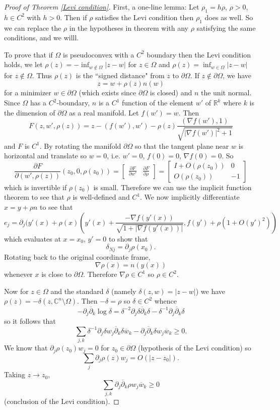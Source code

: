 \documentclass[12pt]{report}
\newcommand{\RR}{\mathbb{R}}
\newcommand{\CC}{\mathbb{C}}
\newcommand{\dbar}{\overline\partial}
\theoremstyle{definition}
\begin{document}
\begin{proof}[Proof of Theorem \ref{Levi condition}]
    First, a one-line lemma: Let $\rho_1 = h\rho$, $\rho > 0$, $h \in C^2$ with $h > 0$. Then if $\rho$ satisfies the Levi condition then $\rho_1$ does as well. So we can replace the $\rho$ in the hypotheses in theorem with any $\rho$ satisfying the same conditions, and we willl.

    To prove that if $\Omega$ is pseudoconvex with a $C^2$ boundary then the Levi condition holds, we let $\rho(z) = -\inf_{w \notin \Omega} |z - w|$ for $z \in \Omega$ and $\rho(z) = \inf_{w \in \Omega} |z - w|$ for $z \notin \Omega$. Thus $\rho(z)$ is the ``signed distance" from $z$ to $\partial \Omega$. If $z \notin \partial \Omega$, we have
    $$z = w + \rho(z)n(w)$$
    for a minimizer $w \in \partial \Omega$ (which exists since $\partial \Omega$ is closed) and $n$ the unit normal. Since $\Omega$ has a $C^2$-boundary, $n$ is a $C^1$ function of the element $w'$ of $\RR^k$ where $k$ is the dimension of $\partial \Omega$ as a real manifold. Let $f(w') = w$. Then
    $$F(z, w', \rho(z)) = z - (f(w'), w') - \rho(z)\frac{(\nabla f(w'), 1)}{\sqrt{|\nabla f(w')|^2 + 1}}$$
    and $F$ is $C^1$. By rotating the manifold $\partial \Omega$ so that the tangent plane near $w$ is horizontal and translate so $w = 0$, i.e. $w' = 0$, $f(0) = 0$, $\nabla f(0) = 0$. So
    $$\frac{\partial F}{\partial(w', \rho(z))}(z_0, 0, \rho(z_0)) = \begin{bmatrix}\frac{\partial F}{\partial w'} & \frac{\partial F}{\partial \rho}\end{bmatrix} = \begin{bmatrix}I + O(\rho(z_0)) & 0 \\ O(\rho(z_0)) & -1\end{bmatrix}$$
    which is invertible if $\rho(z_0)$ is small. Therefore we can use the implicit function theorem to see that $\rho$ is well-defined and $C^1$. We now implicitly differentiate $x = y + \rho n$ to see that
    $$e_j = \partial_j(y'(x) + \rho(x)\left(y'(x) + \frac{-\nabla f(y'(x))}{\sqrt{1 + |\nabla f(y'(x))|}}, f(y') + \rho(1 + O(y')^2)\right)$$ which evaluates at $x = x_0$, $y' = 0$ to show that
    $$\delta_{Nj} = \partial_j \rho(x_0).$$
    Rotating back to the original coordinate frame,
    $$\nabla \rho(x) = n(y(x))$$
    whenever $x$ is close to $\partial \Omega$. Therefore $\nabla \rho \in C^1$ so $\rho \in C^2$.

    Now for $z \in \Omega$ and the standard $\delta$ (namely $\delta(z, w) = |z - w|$) we have $\rho(z) = -\delta(z, \CC^n \setminus \Omega)$. Then $-\delta = \rho$ so $\delta \in C^2$ whence
    $$-\partial_j \dbar_k \log \delta = \delta^{-2} \partial_j \delta \dbar_k \delta - \delta^{-1} \partial_j \dbar_k \delta$$
    so it follows that
    $$\sum_{j,k} \delta^{-1} \partial_j \delta w_j \dbar_k \delta \overline w_k - \partial_j \dbar_k \delta w_j \overline w_k \geq 0.$$
    We know that $\partial_j \rho(z_0) w_j = 0$ for $z_0 \in \partial \Omega$ (hypothesis of the Levi condition) so
    $$\sum_j \partial_j \rho(z) w_j = O(|z - z_0|).$$
    Taking $z \to z_0$,
    $$\sum_{j,k} \partial_j \dbar_k \rho w_j \overline w_k \geq 0$$
    (conclusion of the Levi condition).


\end{proof}
\end{document}

